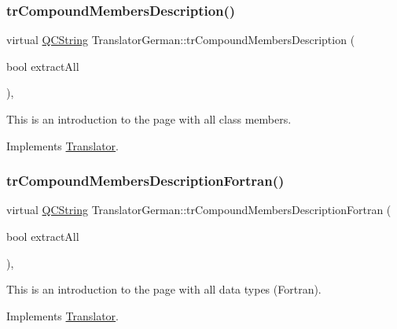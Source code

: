 \subsubsection{\texorpdfstring{trCompoundMembersDescription()}{trCompoundMembersDescription()}}
{\footnotesize\ttfamily virtual \mbox{\hyperlink{class_q_c_string}{Q\+C\+String}} Translator\+German\+::tr\+Compound\+Members\+Description (\begin{DoxyParamCaption}\item[{bool}]{extract\+All }\end{DoxyParamCaption})\hspace{0.3cm}{\ttfamily [inline]}, {\ttfamily [virtual]}}

This is an introduction to the page with all class members. 

Implements \mbox{\hyperlink{class_translator}{Translator}}.

\mbox{\label{class_translator_german_ab27db228036c34eeabf3b0d11b0de450}} 
\subsubsection{\texorpdfstring{trCompoundMembersDescriptionFortran()}{trCompoundMembersDescriptionFortran()}}
{\footnotesize\ttfamily virtual \mbox{\hyperlink{class_q_c_string}{Q\+C\+String}} Translator\+German\+::tr\+Compound\+Members\+Description\+Fortran (\begin{DoxyParamCaption}\item[{bool}]{extract\+All }\end{DoxyParamCaption})\hspace{0.3cm}{\ttfamily [inline]}, {\ttfamily [virtual]}}

This is an introduction to the page with all data types (Fortran). 

Implements \mbox{\hyperlink{class_translator}{Translator}}.

\mbox{\label{class_translator_german_aaa1c746edc25df3bd518e362ed2d06a9}} 
